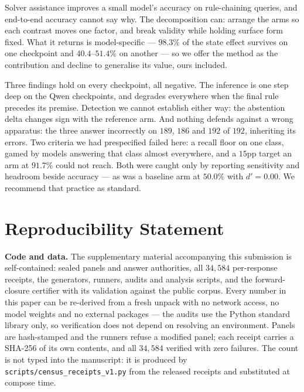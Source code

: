 \documentclass[10pt,twocolumn]{article}
\begin{document}
Solver assistance improves a small model's accuracy on rule-chaining queries, and
end-to-end accuracy cannot say why. The decomposition can: arrange the arms so each
contrast moves one factor, and break validity while holding surface form fixed.
What it returns is model-specific --- $98.3\%$ of the state effect survives on one
checkpoint and $40.4$--$51.4\%$ on another --- so we offer the method as the
contribution and decline to generalise its value, ours included.

Three findings hold on every checkpoint, all negative. The inference is one step
deep on the Qwen checkpoints, and degrades everywhere when the final rule
precedes its premise. Detection we cannot establish either way: the abstention delta changes sign with
the reference arm. And nothing defends against a wrong apparatus: the three answer incorrectly on
$189$, $186$ and $192$ of $192$, inheriting its errors. Two criteria we had prespecified failed here: a recall floor on one class, gamed
by models answering that class almost everywhere, and a $15$pp target an arm at
$91.7\%$ could not reach. Both were caught only by reporting sensitivity and
headroom beside accuracy --- as was a baseline arm at $50.0\%$ with $d' = 0.00$.
We recommend that practice as standard.

\section*{Reproducibility Statement}

\textbf{Code and data.} The supplementary material accompanying this submission
is self-contained: sealed panels and answer authorities, all $34{,}584$
per-response receipts, the generators, runners, audits and analysis scripts, and
the forward-closure certifier with its validation against the public corpus.
Every number in this paper can be re-derived from a fresh unpack with no network
access, no model weights and no external packages --- the audits use the Python
standard library only, so verification does not depend on resolving an
environment. Panels are hash-stamped and the runners refuse a modified panel;
each receipt carries a SHA-256 of its own contents, and all $34{,}584$
verified with zero failures. The count is not typed into the manuscript: it is
produced by \texttt{scripts/census\_receipts\_v1.py} from the released receipts
and substituted at compose time.
\end{document}
